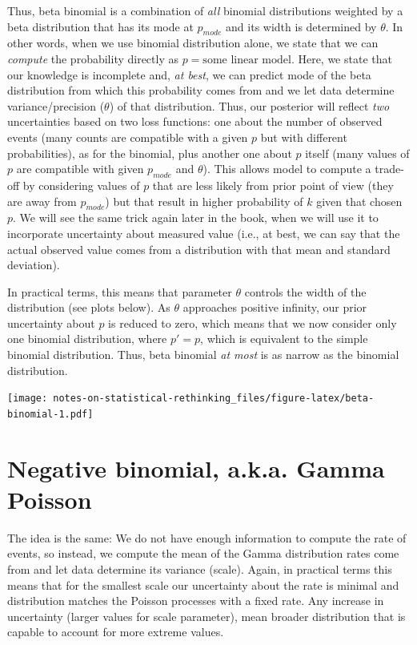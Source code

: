 \documentclass[
]{book}
\begin{document}
Thus, beta binomial is a combination of \emph{all} binomial distributions weighted by a beta distribution that has its mode at \(p_{mode}\) and its width is determined by \(\theta\). In other words, when we use binomial distribution alone, we state that we can \emph{compute} the probability directly as \(p = \text{some linear model}\). Here, we state that our knowledge is incomplete and, \emph{at best}, we can predict mode of the beta distribution from which this probability comes from and we let data determine variance/precision (\(\theta\)) of that distribution. Thus, our posterior will reflect \emph{two} uncertainties based on two loss functions: one about the number of observed events (many counts are compatible with a given \(p\) but with different probabilities), as for the binomial, plus another one about \(p\) itself (many values of \(p\) are compatible with given \(p_{mode}\) and \(\theta\)). This allows model to compute a trade-off by considering values of \(p\) that are less likely from prior point of view (they are away from \(p_{mode}\)) but that result in higher probability of \(k\) given that chosen \(p\). We will see the same trick again later in the book, when we will use it to incorporate uncertainty about measured value (i.e., at best, we can say that the actual observed value comes from a distribution with that mean and standard deviation).

In practical terms, this means that parameter \(\theta\) controls the width of the distribution (see plots below). As \(\theta\) approaches positive infinity, our prior uncertainty about \(p\) is reduced to zero, which means that we now consider only one binomial distribution, where \(p' = p\), which is equivalent to the simple binomial distribution. Thus, beta binomial \emph{at most} is as narrow as the binomial distribution.

\texttt{[image: notes-on-statistical-rethinking\_files/figure-latex/beta-binomial-1.pdf]}

\hypertarget{negative-binomial-a.k.a.-gamma-poisson}{%
\section{Negative binomial, a.k.a. Gamma Poisson}\label{negative-binomial-a.k.a.-gamma-poisson}}

The idea is the same: We do not have enough information to compute the rate of events, so instead, we compute the mean of the Gamma distribution rates come from and let data determine its variance (scale). Again, in practical terms this means that for the smallest scale our uncertainty about the rate is minimal and distribution matches the Poisson processes with a fixed rate. Any increase in uncertainty (larger values for scale parameter), mean broader distribution that is capable to account for more extreme values.
\end{document}
